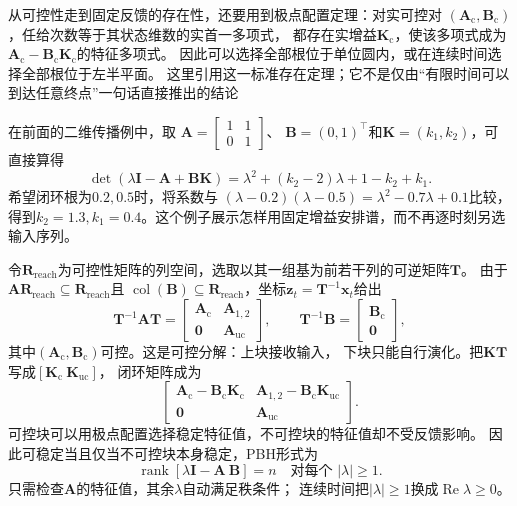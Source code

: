 从可控性走到固定反馈的存在性，还要用到极点配置定理：对实可控对
$(\bm A_{\mathrm c},\bm B_{\mathrm c})$，任给次数等于其状态维数的实首一多项式，
都存在实增益$\bm K_{\mathrm c}$，使该多项式成为
$\bm A_{\mathrm c}-\bm B_{\mathrm c}\bm K_{\mathrm c}$的特征多项式。
因此可以选择全部根位于单位圆内，或在连续时间选择全部根位于左半平面。
这里引用这一标准存在定理；它不是仅由“有限时间可以到达任意终点”一句话直接推出的结论

在前面的二维传播例中，取
$\bm A=\left[\begin{smallmatrix}1&1\\0&1\end{smallmatrix}\right]$、
$\bm B=(0,1)^\top$和$\bm K=(k_1,k_2)$，可直接算得
\[
 \det(\lambda\bm I-\bm A+\bm B\bm K)
 =\lambda^2+(k_2-2)\lambda+1-k_2+k_1.
\]
希望闭环根为$0.2,0.5$时，将系数与
$(\lambda-0.2)(\lambda-0.5)=\lambda^2-0.7\lambda+0.1$比较，
得到$k_2=1.3,k_1=0.4$。这个例子展示怎样用固定增益安排谱，而不再逐时刻另选输入序列。

令$\bm R_{\mathrm{reach}}$为可控性矩阵的列空间，选取以其一组基为前若干列的可逆矩阵$\bm T$。
由于$\bm A\bm R_{\mathrm{reach}}\subseteq\bm R_{\mathrm{reach}}$且
$\operatorname{col}(\bm B)\subseteq\bm R_{\mathrm{reach}}$，坐标$\bm z_t=\bm T^{-1}\bm x_t$给出
\[
  \bm T^{-1}\bm A\bm T=
  \begin{bmatrix}\bm A_{\mathrm c}&\bm A_{1,2}\\
                  \bm0&\bm A_{\mathrm{uc}}\end{bmatrix},
  \qquad
  \bm T^{-1}\bm B=\begin{bmatrix}\bm B_{\mathrm c}\\\bm0\end{bmatrix},
\]
其中$(\bm A_{\mathrm c},\bm B_{\mathrm c})$可控。这是可控分解：上块接收输入，
下块只能自行演化。把$\bm K\bm T$写成$[\bm K_{\mathrm c}\ \bm K_{\mathrm{uc}}]$，
闭环矩阵成为
\[
  \begin{bmatrix}
    \bm A_{\mathrm c}-\bm B_{\mathrm c}\bm K_{\mathrm c}
      &\bm A_{1,2}-\bm B_{\mathrm c}\bm K_{\mathrm{uc}}\\
    \bm0&\bm A_{\mathrm{uc}}
  \end{bmatrix}.
\]
可控块可以用极点配置选择稳定特征值，不可控块的特征值却不受反馈影响。
因此可稳定当且仅当不可控块本身稳定，PBH形式为
\begin{equation}
  \operatorname{rank}[\lambda\bm I-\bm A\ \bm B]=n
  \quad\text{对每个 }|\lambda|\geq1.
  \label{eq:control-pbh-stabilizability}
\end{equation}
只需检查$\bm A$的特征值，其余$\lambda$自动满足秩条件；
连续时间把$|\lambda|\geq1$换成$\operatorname{Re}\lambda\geq0$。

